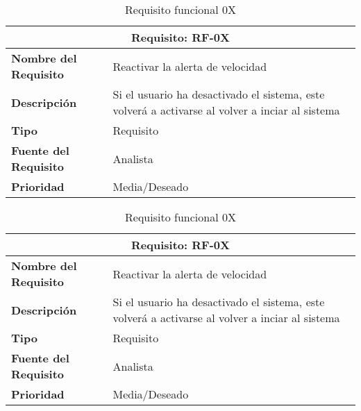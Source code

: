 \documentclass[10pt,a4paper,oldfontcommands]{dpds}
\begin{document}
\begin{table}[h]
\begin{center}
\begin{tabular}{p{} p{7cm}}
\multicolumn{2}{c}{\textbf{Requisito: RF-0X} } \\
\hline \hline
\textbf{Nombre del Requisito} & Reactivar la alerta de velocidad \\
\textbf{Descripción} & Si el usuario ha desactivado el sistema, este volverá a activarse al volver a inciar al sistema \\
\textbf{Tipo} & Requisito  \\
\textbf{Fuente del Requisito} & Analista  \\
\textbf{Prioridad} & Media/Deseado  \\ \hline
\end{tabular}
\caption{Requisito funcional 0X}
\label{tab:personal}
\end{center}
\end{table}

\begin{table}[h]
\begin{center}
\begin{tabular}{p{} p{7cm}}
\multicolumn{2}{c}{\textbf{Requisito: RF-0X} } \\
\hline \hline
\textbf{Nombre del Requisito} & Reactivar la alerta de velocidad \\
\textbf{Descripción} & Si el usuario ha desactivado el sistema, este volverá a activarse al volver a inciar al sistema \\
\textbf{Tipo} & Requisito  \\
\textbf{Fuente del Requisito} & Analista  \\
\textbf{Prioridad} & Media/Deseado  \\ \hline
\end{tabular}
\caption{Requisito funcional 0X}
\label{tab:personal}
\end{center}
\end{table}
\end{document}
